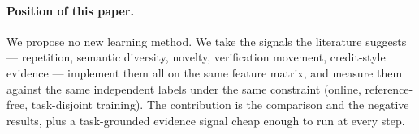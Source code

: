 \paragraph{Position of this paper.}
We propose no new learning method. We take the signals the literature suggests --- repetition, semantic
diversity, novelty, verification movement, credit-style evidence --- implement them all on the same feature
matrix, and measure them against the same independent labels under the same constraint (online,
reference-free, task-disjoint training). The contribution is the comparison and the negative results, plus
a task-grounded evidence signal cheap enough to run at every step.
